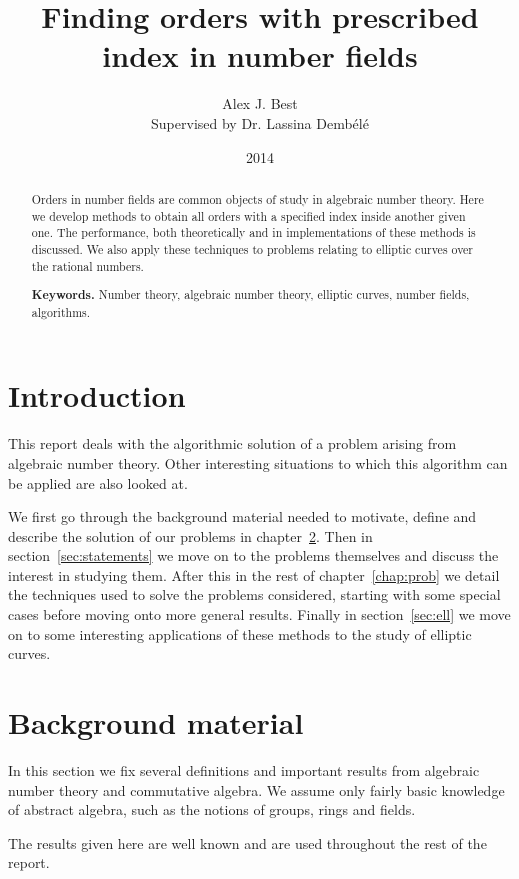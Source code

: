 \documentclass[a4paper,abstracton,bibtotoc]{scrreprt}
\author{Alex J. Best \\ Supervised by Dr. Lassina Demb\'el\'e}
\date{2014}
\title{Finding orders with prescribed index in number fields}
\theoremstyle{definition}
\begin{document}
\maketitle

\begin{abstract}
Orders in number fields are common objects of study in algebraic number theory.
Here we develop methods to obtain all orders with a specified index inside another given one.
The performance, both theoretically and in implementations of these methods is discussed.
We also apply these techniques to problems relating to elliptic curves over the rational numbers.

\smallskip
\noindent \textbf{Keywords.} Number theory, algebraic number theory, elliptic curves, number fields, algorithms.
\end{abstract}

\tableofcontents

\chapter{Introduction}
This report deals with the algorithmic solution of a problem arising from algebraic number theory. 
Other interesting situations to which this algorithm can be applied are also looked at.

We first go through the background material needed to motivate, define and describe the solution of our problems in chapter~\ref{chap:background}.
Then in section~\ref{sec:statements} we move on to the problems themselves and discuss the interest in studying them.
After this in the rest of chapter~\ref{chap:prob} we detail the techniques used to solve the problems considered, starting with some special cases before moving onto more general results.
Finally in section~\ref{sec:ell} we move on to some interesting applications of these methods to the study of elliptic curves.

\chapter{Background material}
\label{chap:background}

In this section we fix several definitions and important results from algebraic number theory and commutative algebra.
We assume only fairly basic knowledge of abstract algebra, such as the notions of groups, rings and fields.

The results given here are well known and are used throughout the rest of the report.
\end{document}
